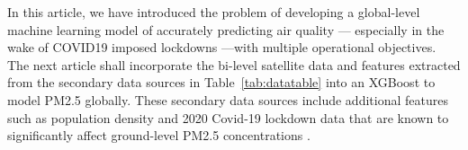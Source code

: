 In this article, we have introduced the problem of developing a global-level machine learning model of accurately predicting air quality — especially in the wake of COVID19 imposed lockdowns —with multiple operational objectives. The next article shall incorporate the bi-level satellite data and features extracted from the secondary data sources in Table~\ref{tab:datatable} into an XGBoost to model PM2.5 globally. These secondary data sources include additional features such as population density and 2020 Covid-19 lockdown data that are known to significantly affect ground-level PM2.5 concentrations \cite{Hale}.